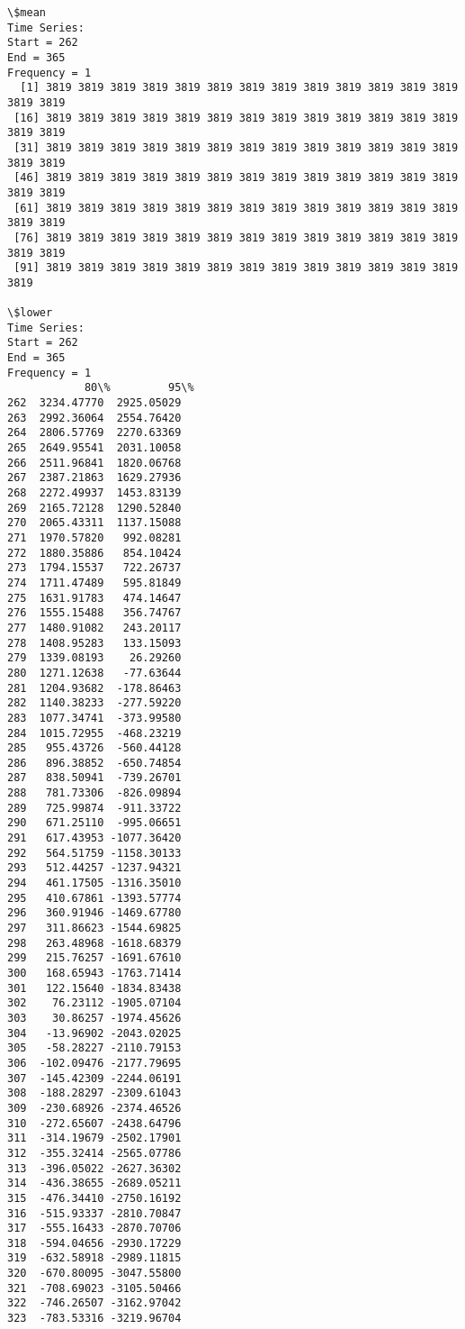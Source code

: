 \documentclass[11pt]{article}
\begin{document}
    \begin{Verbatim}[commandchars=\\\{\}]
\$mean
Time Series:
Start = 262 
End = 365 
Frequency = 1 
  [1] 3819 3819 3819 3819 3819 3819 3819 3819 3819 3819 3819 3819 3819 3819 3819
 [16] 3819 3819 3819 3819 3819 3819 3819 3819 3819 3819 3819 3819 3819 3819 3819
 [31] 3819 3819 3819 3819 3819 3819 3819 3819 3819 3819 3819 3819 3819 3819 3819
 [46] 3819 3819 3819 3819 3819 3819 3819 3819 3819 3819 3819 3819 3819 3819 3819
 [61] 3819 3819 3819 3819 3819 3819 3819 3819 3819 3819 3819 3819 3819 3819 3819
 [76] 3819 3819 3819 3819 3819 3819 3819 3819 3819 3819 3819 3819 3819 3819 3819
 [91] 3819 3819 3819 3819 3819 3819 3819 3819 3819 3819 3819 3819 3819 3819

\$lower
Time Series:
Start = 262 
End = 365 
Frequency = 1 
            80\%         95\%
262  3234.47770  2925.05029
263  2992.36064  2554.76420
264  2806.57769  2270.63369
265  2649.95541  2031.10058
266  2511.96841  1820.06768
267  2387.21863  1629.27936
268  2272.49937  1453.83139
269  2165.72128  1290.52840
270  2065.43311  1137.15088
271  1970.57820   992.08281
272  1880.35886   854.10424
273  1794.15537   722.26737
274  1711.47489   595.81849
275  1631.91783   474.14647
276  1555.15488   356.74767
277  1480.91082   243.20117
278  1408.95283   133.15093
279  1339.08193    26.29260
280  1271.12638   -77.63644
281  1204.93682  -178.86463
282  1140.38233  -277.59220
283  1077.34741  -373.99580
284  1015.72955  -468.23219
285   955.43726  -560.44128
286   896.38852  -650.74854
287   838.50941  -739.26701
288   781.73306  -826.09894
289   725.99874  -911.33722
290   671.25110  -995.06651
291   617.43953 -1077.36420
292   564.51759 -1158.30133
293   512.44257 -1237.94321
294   461.17505 -1316.35010
295   410.67861 -1393.57774
296   360.91946 -1469.67780
297   311.86623 -1544.69825
298   263.48968 -1618.68379
299   215.76257 -1691.67610
300   168.65943 -1763.71414
301   122.15640 -1834.83438
302    76.23112 -1905.07104
303    30.86257 -1974.45626
304   -13.96902 -2043.02025
305   -58.28227 -2110.79153
306  -102.09476 -2177.79695
307  -145.42309 -2244.06191
308  -188.28297 -2309.61043
309  -230.68926 -2374.46526
310  -272.65607 -2438.64796
311  -314.19679 -2502.17901
312  -355.32414 -2565.07786
313  -396.05022 -2627.36302
314  -436.38655 -2689.05211
315  -476.34410 -2750.16192
316  -515.93337 -2810.70847
317  -555.16433 -2870.70706
318  -594.04656 -2930.17229
319  -632.58918 -2989.11815
320  -670.80095 -3047.55800
321  -708.69023 -3105.50466
322  -746.26507 -3162.97042
323  -783.53316 -3219.96704

\end{Verbatim}
\end{document}
